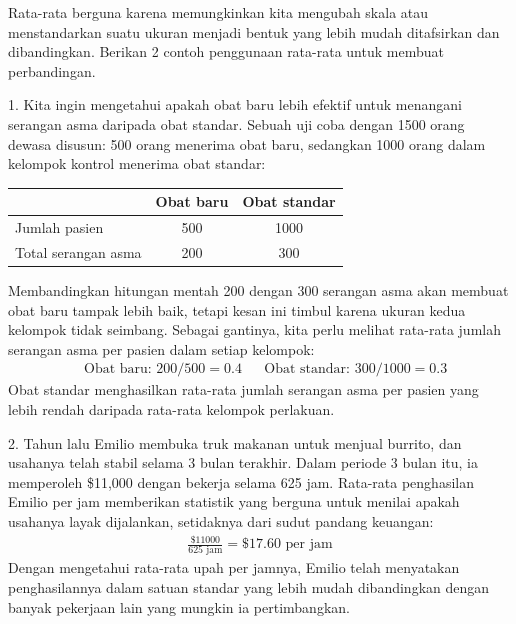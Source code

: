 \begin{examplewrap}
\begin{nexample}{Rata-rata berguna karena memungkinkan kita
    mengubah skala atau menstandarkan suatu ukuran menjadi bentuk
    yang lebih mudah ditafsirkan dan dibandingkan.
    Berikan 2 contoh penggunaan rata-rata untuk membuat
    perbandingan.}

  1. Kita ingin mengetahui apakah obat baru lebih efektif
  untuk menangani serangan asma daripada obat standar.
  Sebuah uji coba dengan 1500 orang dewasa disusun: 500 orang
  menerima obat baru, sedangkan 1000 orang dalam kelompok kontrol
  menerima obat standar:\vspace{-2mm}
  \begin{center}
  \begin{tabular}{l cc}
  &           Obat baru & Obat standar \\
  \hline
  Jumlah pasien         & 500 & 1000 \\
  Total serangan asma   & 200 & 300 \\
  \hline
  \end{tabular}
  \end{center}
  Membandingkan hitungan mentah 200 dengan 300 serangan asma
  akan membuat obat baru tampak lebih baik, tetapi kesan ini
  timbul karena ukuran kedua kelompok tidak seimbang.
  Sebagai gantinya, kita perlu melihat rata-rata jumlah serangan
  asma per pasien dalam setiap kelompok:
  \begin{align*}
  & \text{Obat baru: } 200 / 500 = 0.4 %
  && \text{Obat standar: } 300 / 1000 = 0.3
  \end{align*}
  Obat standar menghasilkan rata-rata jumlah serangan asma per
  pasien yang lebih rendah daripada rata-rata kelompok perlakuan.

  2. Tahun lalu Emilio membuka truk makanan untuk menjual burrito,
  dan usahanya telah stabil selama 3 bulan terakhir.
  Dalam periode 3 bulan itu, ia memperoleh \$11,000 dengan
  bekerja selama 625 jam.
  Rata-rata penghasilan Emilio per jam memberikan statistik yang
  berguna untuk menilai apakah usahanya layak dijalankan,
  setidaknya dari sudut pandang keuangan:
  \begin{align*}
  \frac{\$11000}{625\text{ jam}} = \$17.60\text{ per jam}
  \end{align*}
  Dengan mengetahui rata-rata upah per jamnya, Emilio telah
  menyatakan penghasilannya dalam satuan standar yang lebih mudah
  dibandingkan dengan banyak pekerjaan lain yang mungkin ia
  pertimbangkan.
\end{nexample}
\end{examplewrap}

